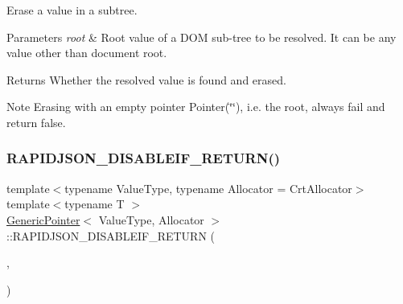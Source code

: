 Erase a value in a subtree. 


\begin{DoxyParams}{Parameters}
{\em root} & Root value of a D\+OM sub-\/tree to be resolved. It can be any value other than document root. \\
\hline
\end{DoxyParams}
\begin{DoxyReturn}{Returns}
Whether the resolved value is found and erased.
\end{DoxyReturn}
\begin{DoxyNote}{Note}
Erasing with an empty pointer {\ttfamily Pointer}(\char`\"{}\char`\"{}), i.\+e. the root, always fail and return false. 
\end{DoxyNote}
\mbox{\label{classGenericPointer_aaf4d7d852098878d24188d134182d42f}} 
\subsubsection{\texorpdfstring{R\+A\+P\+I\+D\+J\+S\+O\+N\+\_\+\+D\+I\+S\+A\+B\+L\+E\+I\+F\+\_\+\+R\+E\+T\+U\+R\+N()}{RAPIDJSON\_DISABLEIF\_RETURN()}\hspace{0.1cm}{\footnotesize\ttfamily [1/3]}}
{\footnotesize\ttfamily template$<$typename Value\+Type, typename Allocator = Crt\+Allocator$>$ \\
template$<$typename T $>$ \\
\hyperlink{classGenericPointer}{Generic\+Pointer}$<$ Value\+Type, Allocator $>$\+::R\+A\+P\+I\+D\+J\+S\+O\+N\+\_\+\+D\+I\+S\+A\+B\+L\+E\+I\+F\+\_\+\+R\+E\+T\+U\+RN (\begin{DoxyParamCaption}\item[{(internal\+::\+Not\+Expr$<$ internal\+::\+Is\+Same$<$ typename internal\+::\+Remove\+Const$<$ T $>$\+::Type, \hyperlink{classGenericPointer_ab292356c11b4015c98d21b966b11f285}{Ch} $>$ $>$)}]{,  }\item[{(\hyperlink{classGenericPointer}{Generic\+Pointer}$<$ Value\+Type, Allocator $>$)}]{ }\end{DoxyParamCaption})}



